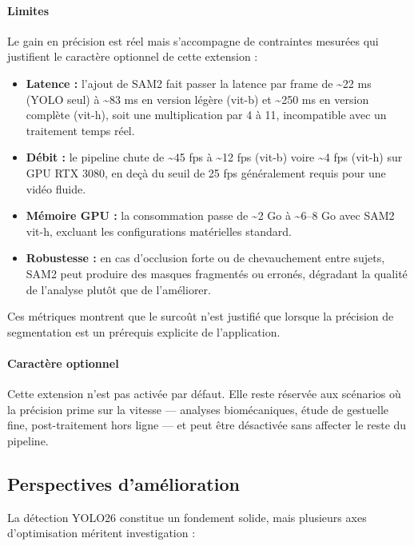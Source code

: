 \paragraph{Limites}
Le gain en précision est réel mais s'accompagne de contraintes mesurées qui
justifient le caractère optionnel de cette extension :

\begin{itemize}
  \item \textbf{Latence :} l'ajout de SAM2 fait passer la latence par frame de
  \textasciitilde 22 ms (YOLO seul) à \textasciitilde 83 ms en version légère
  (vit-b) et \textasciitilde 250 ms en version complète (vit-h), soit une
  multiplication par 4 à 11, incompatible avec un traitement temps réel.
  \item \textbf{Débit :} le pipeline chute de \textasciitilde 45 fps à \textasciitilde 12 fps
  (vit-b) voire \textasciitilde 4 fps (vit-h) sur GPU RTX 3080, en deçà du
  seuil de 25 fps généralement requis pour une vidéo fluide.
  \item \textbf{Mémoire GPU :} la consommation passe de \textasciitilde 2 Go à
  \textasciitilde 6--8 Go avec SAM2 vit-h, excluant les configurations matérielles
  standard.
  \item \textbf{Robustesse :} en cas d'occlusion forte ou de chevauchement entre
  sujets, SAM2 peut produire des masques fragmentés ou erronés, dégradant la
  qualité de l'analyse plutôt que de l'améliorer.
\end{itemize}

Ces métriques montrent que le surcoût n'est justifié que lorsque la précision
de segmentation est un prérequis explicite de l'application.

\paragraph{Caractère optionnel}
Cette extension n'est pas activée par défaut. Elle reste réservée aux scénarios
où la précision prime sur la vitesse — analyses biomécaniques, étude de gestuelle
fine, post-traitement hors ligne — et peut être désactivée sans affecter le reste
du pipeline.
 
\subsection{Perspectives d'amélioration}

La détection YOLO26 constitue un fondement solide, mais plusieurs axes d'optimisation méritent investigation :

